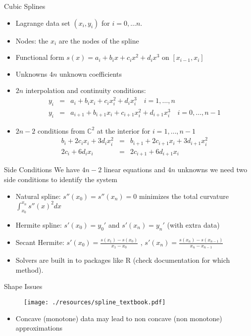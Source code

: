 \begin{frame}{Cubic Splines}
\small
\begin{itemize}
\item Lagrange data set $(x_i,y_i)$ for $i=0,\ldots n$.
\item Nodes: the $x_i$ are the nodes of the spline
\item Functional form $s(x) = a_i + b_i x + c_i x^2 + d_i x^3$ on $[x_{i-1},x_i]$
\item Unknowns $4n$ unknown coefficients
\item $2n$ interpolation and continuity conditions:
\begin{eqnarray*}
y_i &=& a_i + b_i x_i + c_i x_i^2 + d_i x_i^3 \quad i=1,\dots, n\\
y_i &=& a_{i+1} + b_{i+1} x_i + c_{i+1} x_i^2 + d_{i+1} x_i^3 \quad i=0,\ldots, n-1
\end{eqnarray*}
\item $2n - 2$ conditions from $\mathbb{C}^2$ at the interior for $i=1,\ldots,n-1$
\begin{eqnarray*}
b_i + 2c_i x_i + 3 d_i x_i^2  &=& b_{i+1} + 2 c_{i+1} x_i + 3 d_{i+1}x_i^2\\ 
2c_i + 6d_i x_i &=& 2c_{i+1} + 6d_{i+1} x_i
\end{eqnarray*}
\end{itemize}
\end{frame}


\begin{frame}{Side Conditions}
We have $4n-2$ linear equations and $4n$ unknowns we need two side conditions to identify the system
\begin{itemize}
\item Natural spline: $s''(x_0) = s''(x_n) = 0$ minimizes the total curvature $\int_{x_0}^{x_n} s''(x)^2 dx$
\item Hermite spline: $s'(x_0) = y_0'$ and $s'(x_n) = y_n'$ (with extra data)
\item Secant Hermite: $s'(x_0) = \frac{s(x_1) - s(x_0)}{x_1-x_0}$ , $s'(x_n) = \frac{s(x_n) - s(x_{n-1})}{x_n-x_{n-1}}$
\item Solvers are built in to packages like R (check documentation for which method).
\end{itemize}
\end{frame}


\begin{frame}{Shape Issues}
\begin{figure}[htbp]
\begin{center}
\texttt{[image: ./resources/spline\_textbook.pdf]}
\label{default}
\end{center}
\end{figure}
\begin{itemize}
\item Concave (monotone) data may lead to non concave (non monotone) approximations
\end{itemize}
\end{frame}


